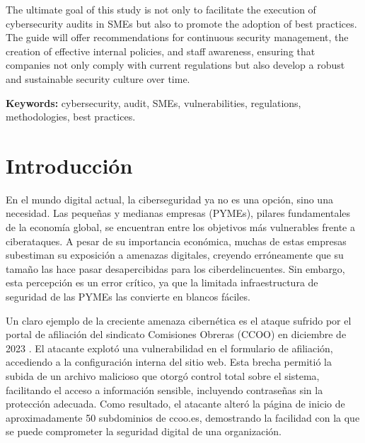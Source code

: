 \documentclass[a4paper, 10pt]{article}
\begin{document}
The ultimate goal of this study is not only to facilitate the execution of cybersecurity audits in SMEs but also to promote the adoption of best practices. The guide will offer recommendations for continuous security management, the creation of effective internal policies, and staff awareness, ensuring that companies not only comply with current regulations but also develop a robust and sustainable security culture over time.

\par\vspace{0.5cm}
\textbf{Keywords:} cybersecurity, audit, SMEs, vulnerabilities, regulations, methodologies, best practices.
\clearpage



\section{Introducción}
En el mundo digital actual, la ciberseguridad ya no es una opción, sino una necesidad. Las pequeñas y medianas empresas (PYMEs), pilares fundamentales de la economía global, se encuentran entre los objetivos más vulnerables frente a ciberataques. A pesar de su importancia económica, 
muchas de estas empresas subestiman su exposición a amenazas digitales, creyendo erróneamente que su tamaño las hace pasar desapercibidas para los ciberdelincuentes. Sin embargo, esta percepción es un error crítico, ya que la limitada infraestructura de seguridad de las 
PYMEs las convierte en blancos fáciles. 
\par\vspace{0.5cm}

Un claro ejemplo de la creciente amenaza cibernética es el ataque sufrido por el portal de afiliación del sindicato Comisiones Obreras (CCOO) en diciembre de 2023 \cite{farlopa}. El atacante explotó una vulnerabilidad en el formulario de afiliación, accediendo a la configuración interna del sitio web. Esta brecha permitió la subida de un archivo malicioso que otorgó control total sobre el sistema, facilitando el acceso a información sensible, incluyendo contraseñas sin la protección adecuada. Como resultado, el atacante alteró la página de inicio de aproximadamente 50 subdominios de ccoo.es, demostrando la facilidad con la que se puede comprometer la seguridad digital de una organización.
\par\vspace{0.5cm}
\end{document}
